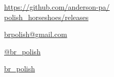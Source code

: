 \begin{description}[listparindent=1.cm, font=\normalfont]
	\item[{\faGlobe}] \href{https://github.com/anderson-pa/polish_horseshoes/releases}{https://github.com/anderson-pa/\\\indent polish\_horseshoes/releases}

	\item[\faEnvelopeO] \href{mailto:brpolish@gmail.com}{brpolish@gmail.com}

	\item[\faTwitter] \href{http://www.twitter.com/br_polish}{@br\_{}polish}

	\item[\faTwitch] \href{http://www.twitch.tv/br_polish}{br\_{}polish}
\end{description}